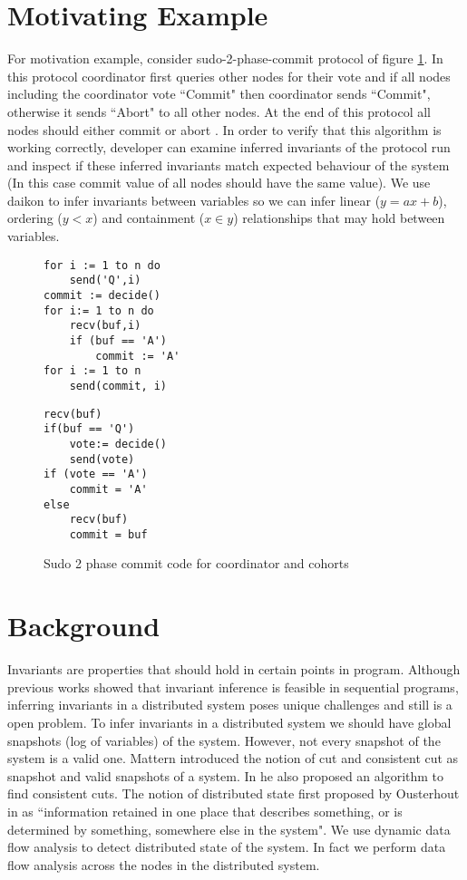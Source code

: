 \section{Motivating Example}
For motivation example, consider sudo-2-phase-commit protocol of figure \ref{lst:2pc}. In this protocol coordinator first queries other nodes for their vote and if all nodes including the coordinator vote ``Commit" then coordinator sends ``Commit", otherwise it sends ``Abort" to all other nodes. At the end of this protocol all nodes should either commit or abort . In order to verify that this algorithm is working correctly, developer can examine inferred invariants of the protocol run and inspect if these inferred invariants match expected behaviour of the system (In this case commit value of all nodes should have the same value). We use daikon \cite{ernst2001dynamically} to infer invariants between variables so we can infer linear ($y = ax + b$), ordering ($y < x$) and containment ($x \in y$) relationships that may hold between variables.


\begin{figure}
\centering
\begin{lstlisting}[caption={Coordinator Code}]
for i := 1 to n do
	send('Q',i)
commit := decide()
for i:= 1 to n do
	recv(buf,i)
	if (buf == 'A')
		commit := 'A'
for i := 1 to n
	send(commit, i)
\end{lstlisting}
\begin{lstlisting}[caption={Coordinator Code}]
recv(buf)
if(buf == 'Q')
	vote:= decide()
	send(vote)
if (vote == 'A')
	commit = 'A'
else
	recv(buf)
	commit = buf
\end{lstlisting}
\caption{Sudo 2 phase commit code for coordinator and cohorts}
\label{lst:2pc}
\end{figure}

\section{Background}

Invariants are properties that should hold in  certain points in program. Although previous works \cite{ernst2001dynamically} showed that invariant inference is feasible in sequential programs, inferring invariants in a distributed system poses unique challenges and still is a open problem. To infer invariants in a distributed system we should have global snapshots (log of variables) of the system. However, not every snapshot of the system is a valid one. Mattern introduced the notion of cut and consistent cut as snapshot and valid snapshots of a system. In \cite{mattern1989virtual} he also proposed an algorithm to find consistent cuts. The notion of distributed state first proposed by Ousterhout in \cite{ousterhout1991role} as ``information retained in one place that describes something, or is determined by something, somewhere else in the system". We use dynamic data flow analysis to detect distributed state of the system. In fact we perform data flow analysis across the nodes in the distributed system.


